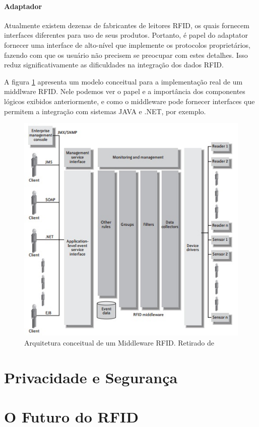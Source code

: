 \documentclass[a4paper,12pt,titlepage]{article}
\begin{document}
	\paragraph{Adaptador} Atualmente existem dezenas de fabricantes de leitores RFID, os quais fornecem interfaces diferentes para uso de seus produtos. Portanto, é papel do adaptator fornecer uma interface de alto-nível que implemente os protocolos proprietários, fazendo com que os usuário não precisem se preocupar com estes detalhes. Isso reduz significativamente as dificuldades na integração dos dados RFID.
	
	A figura \ref{fig:midarc} apresenta um modelo conceitual para a implementação real de um middlware RFID. Nele podemos ver o papel e a importância dos componentes lógicos exibidos anteriormente, e como o middleware pode fornecer interfaces que permitem a integração com sistemas JAVA e .NET, por exemplo.
	
		\begin{figure}[h!]
			\centering
			\includegraphics[width=0.5\linewidth]{midarc}
			\caption{Arquitetura conceitual de um Middleware RFID. Retirado de \cite{rfidbook}}
			\label{fig:midarc}
		\end{figure}
	
	\section{Privacidade e Segurança}
	
	\section{O Futuro do RFID}
	
	\newpage
	 
	 \nocite{*}
	 
	 
\end{document}

